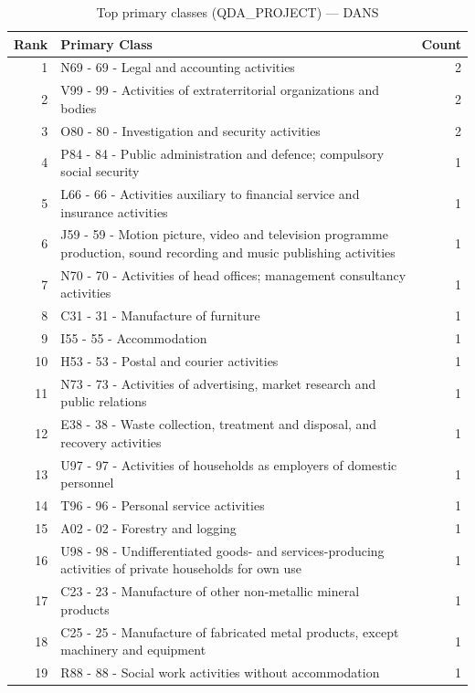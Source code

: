 \begin{table}[H]
    \centering
    \begin{tabular}{r p{10cm} r}
    \hline
    \textbf{Rank} & \textbf{Primary Class} & \textbf{Count} \\
    \hline
    1 & N69 - 69 - Legal and accounting activities & 2 \\
    2 & V99 - 99 - Activities of extraterritorial organizations and bodies & 2 \\
    3 & O80 - 80 - Investigation and security activities & 2 \\
    4 & P84 - 84 - Public administration and defence; compulsory social security & 1 \\
    5 & L66 - 66 - Activities auxiliary to financial service and insurance activities & 1 \\
    6 & J59 - 59 - Motion picture, video and television programme production, sound recording and music publishing activities & 1 \\
    7 & N70 - 70 - Activities of head offices; management consultancy activities & 1 \\
    8 & C31 - 31 - Manufacture of furniture & 1 \\
    9 & I55 - 55 - Accommodation & 1 \\
    10 & H53 - 53 - Postal and courier activities & 1 \\
    11 & N73 - 73 - Activities of advertising, market research and public relations & 1 \\
    12 & E38 - 38 - Waste collection, treatment and disposal, and recovery activities & 1 \\
    13 & U97 - 97 - Activities of households as employers of domestic personnel & 1 \\
    14 & T96 - 96 - Personal service activities & 1 \\
    15 & A02 - 02 - Forestry and logging & 1 \\
    16 & U98 - 98 - Undifferentiated goods- and services-producing activities of private households for own use & 1 \\
    17 & C23 - 23 - Manufacture of other non-metallic mineral products & 1 \\
    18 & C25 - 25 - Manufacture of fabricated metal products, except machinery and equipment & 1 \\
    19 & R88 - 88 - Social work activities without accommodation & 1 \\
    \hline
    \end{tabular}
    \caption{Top primary classes (QDA\_PROJECT) --- DANS}
\end{table}

